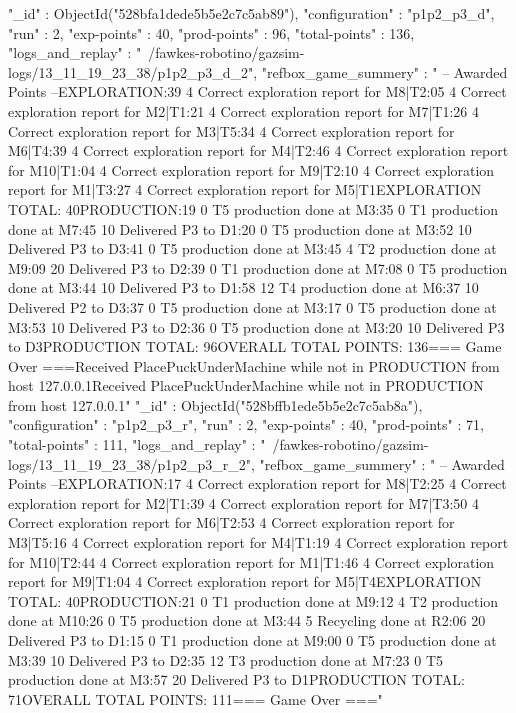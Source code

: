 { "_id" : ObjectId("528bfa1dede5b5e2c7c5ab89"), "configuration" : "p1p2_p3_d", "run" : 2, "exp-points" : 40, "prod-points" : 96, "total-points" : 136, "logs_and_replay" : "~/fawkes-robotino/gazsim-logs/13_11_19_23_38/p1p2_p3_d_2", "refbox_game_summery" : " -- Awarded Points --\n EXPLORATION:39   4  Correct exploration report for M8|T2:05   4  Correct exploration report for M2|T1:21   4  Correct exploration report for M7|T1:26   4  Correct exploration report for M3|T5:34   4  Correct exploration report for M6|T4:39   4  Correct exploration report for M4|T2:46   4  Correct exploration report for M10|T1:04   4  Correct exploration report for M9|T2:10   4  Correct exploration report for M1|T3:27   4  Correct exploration report for M5|T1\n EXPLORATION TOTAL: 40\n PRODUCTION:19   0  T5 production done at M3:35   0  T1 production done at M7:45  10  Delivered P3 to D1:20   0  T5 production done at M3:52  10  Delivered P3 to D3:41   0  T5 production done at M3:45   4  T2 production done at M9:09  20  Delivered P3 to D2:39   0  T1 production done at M7:08   0  T5 production done at M3:44  10  Delivered P3 to D1:58  12  T4 production done at M6:37  10  Delivered P2 to D3:37   0  T5 production done at M3:17   0  T5 production done at M3:53  10  Delivered P3 to D2:36   0  T5 production done at M3:20  10  Delivered P3 to D3\n PRODUCTION TOTAL: 96\n OVERALL TOTAL POINTS: 136\n ===  Game Over  ===\n Received PlacePuckUnderMachine while not in PRODUCTION from host 127.0.0.1\n Received PlacePuckUnderMachine while not in PRODUCTION from host 127.0.0.1\n" }
{ "_id" : ObjectId("528bffb1ede5b5e2c7c5ab8a"), "configuration" : "p1p2_p3_r", "run" : 2, "exp-points" : 40, "prod-points" : 71, "total-points" : 111, "logs_and_replay" : "~/fawkes-robotino/gazsim-logs/13_11_19_23_38/p1p2_p3_r_2", "refbox_game_summery" : " -- Awarded Points --\n EXPLORATION:17   4  Correct exploration report for M8|T2:25   4  Correct exploration report for M2|T1:39   4  Correct exploration report for M7|T3:50   4  Correct exploration report for M6|T2:53   4  Correct exploration report for M3|T5:16   4  Correct exploration report for M4|T1:19   4  Correct exploration report for M10|T2:44   4  Correct exploration report for M1|T1:46   4  Correct exploration report for M9|T1:04   4  Correct exploration report for M5|T4\n EXPLORATION TOTAL: 40\n PRODUCTION:21   0  T1 production done at M9:12   4  T2 production done at M10:26   0  T5 production done at M3:44   5  Recycling done at R2:06  20  Delivered P3 to D1:15   0  T1 production done at M9:00   0  T5 production done at M3:39  10  Delivered P3 to D2:35  12  T3 production done at M7:23   0  T5 production done at M3:57  20  Delivered P3 to D1\n PRODUCTION TOTAL: 71\n OVERALL TOTAL POINTS: 111\n ===  Game Over  ===\n" }
